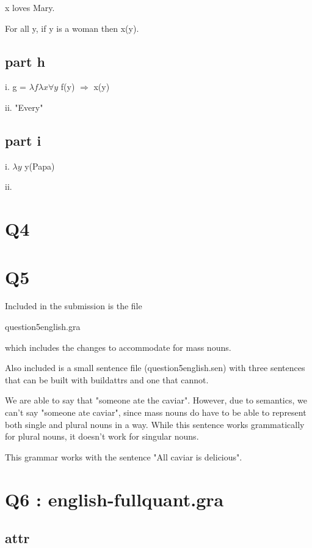 \documentclass[12pt, letterpaper]{article}
\begin{document}
x loves Mary.

For all y, if y is a woman then x(y).

\subsection{part h}

i. g = $\lambda f \lambda x \forall y$ f(y) $\Rightarrow$ x(y)

ii. "Every"

\subsection{part i}

i. $\lambda y$ y(Papa)

ii. %

\section{Q4}

\section{Q5}
Included in the submission is the file

question5english.gra

which includes the changes to accommodate for mass nouns.

Also included is a small sentence file (question5english.sen) with three sentences that can be built with buildattrs and one that cannot. 

We are able to say that "someone ate the caviar". However, due to semantics, we can't say "someone ate caviar", since mass nouns do have to be able to represent both single and plural nouns in a way. While this sentence works grammatically for plural nouns, it doesn't work for singular nouns. 

This grammar works with the sentence "All caviar is delicious".

\section{Q6 : english-fullquant.gra}
\subsection{attr}

\end{document}
